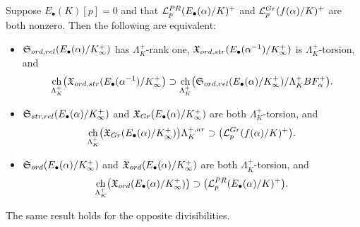 \documentclass[10pt,a4paper]{amsart}
\newcommand{\Lcal}{\mathcal{L}}
\newcommand{\X}{\mathfrak{X}}
\DeclareMathOperator{\ch}{ch}
\begin{document}
\begin{prop}\label{prop:equiv}
Suppose $E_\bullet(K)[p]=0$ and that $\Lcal_p^{\rm PR}(E_\bullet(\alpha)/K)^+$ and $\Lcal_p^{\rm Gr}(f(\alpha)/K)^+$ are both nonzero. Then the following are equivalent:
\begin{itemize}
\item[(i)] $\mathfrak{S}_{\rm ord,\rm rel}(E_\bullet(\alpha)/K_\infty^+)$ has $\Lambda_K^+$-rank one, $\X_{\rm ord,\rm str}(E_\bullet(\alpha^{-1})/K_\infty^+)$ is $\Lambda_K^+$-torsion, and
\[
\ch_{\Lambda_K^+}\bigl(\X_{\rm ord,\rm str}(E_\bullet(\alpha^{-1})/K_\infty^+\bigr)\supset\ch_{\Lambda_K^+}\bigl(\mathfrak{S}_{\rm ord,\rm rel}(E_\bullet(\alpha)/K_\infty^+)/\Lambda_K^+BF_{\alpha}^+\bigr).
\]
\item[(ii)] $\mathfrak{S}_{\rm str,\rm rel}(E_\bullet(\alpha)/K_\infty^+)$ and $\X_{\rm Gr}(E_\bullet(\alpha)/K_\infty^+)$ are both $\Lambda_K^+$-torsion, and
\[
\ch_{\Lambda_K^+}\bigl(\X_{\rm Gr}(E_\bullet(\alpha)/K_\infty^+)\bigr)\Lambda_K^{+,\rm ur}\supset\bigl(\Lcal_p^{\rm Gr}(f(\alpha)/K)^+\bigr).
\]
\item[(iii)] $\mathfrak{S}_{\rm ord}(E_\bullet(\alpha)/K_\infty^+)$ and $\X_{\rm ord}(E_\bullet(\alpha)/K_\infty^+)$ are both $\Lambda_K^+$-torsion, and
\[
\ch_{\Lambda^+_K}\bigl(\X_{\rm ord}(E_\bullet(\alpha)/K_\infty^+)\bigr)\supset\bigl(\Lcal_p^{\rm PR}(E_\bullet(\alpha)/K)^+\bigr).
\]
\end{itemize}
The same result holds for the opposite divisibilities.
\end{prop}
\end{document}
